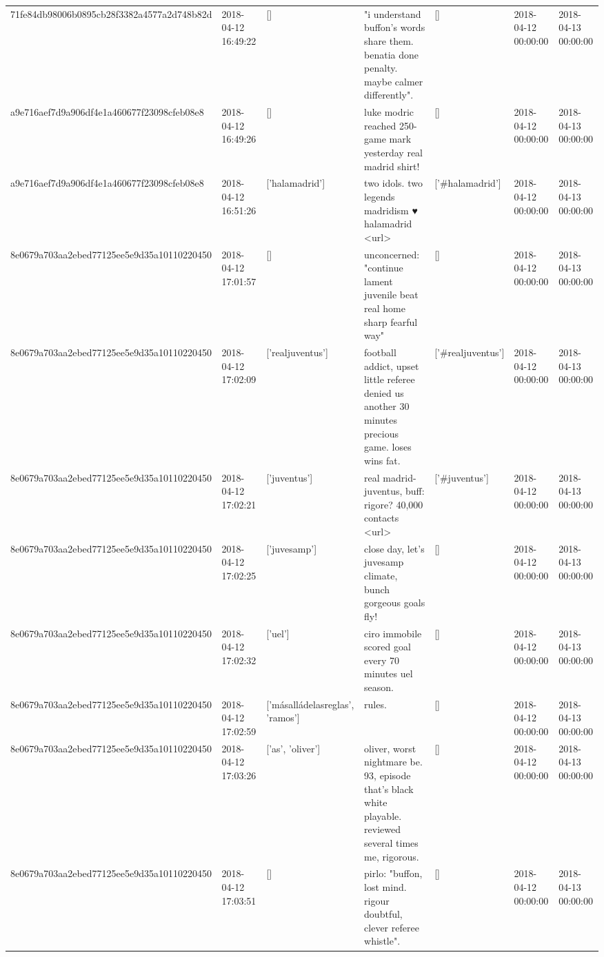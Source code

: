 \begin{tabular}{lllllll}
71fe84db98006b0895cb28f3382a4577a2d748b82d & 2018-04-12 16:49:22 & [] & "i understand buffon's words share them. benatia done penalty. maybe calmer differently". & [] & 2018-04-12 00:00:00 & 2018-04-13 00:00:00 \\
a9e716aef7d9a906df4e1a460677f23098cfeb08e8 & 2018-04-12 16:49:26 & [] & luke modric reached 250-game mark yesterday real madrid shirt! & [] & 2018-04-12 00:00:00 & 2018-04-13 00:00:00 \\
a9e716aef7d9a906df4e1a460677f23098cfeb08e8 & 2018-04-12 16:51:26 & ['halamadrid'] & two idols. two legends madridism ♥️ halamadrid <url> & ['#halamadrid'] & 2018-04-12 00:00:00 & 2018-04-13 00:00:00 \\
8e0679a703aa2ebed77125ee5e9d35a10110220450 & 2018-04-12 17:01:57 & [] & unconcerned: "continue lament juvenile beat real home sharp fearful way" & [] & 2018-04-12 00:00:00 & 2018-04-13 00:00:00 \\
8e0679a703aa2ebed77125ee5e9d35a10110220450 & 2018-04-12 17:02:09 & ['realjuventus'] & football addict, upset little referee denied us another 30 minutes precious game. loses wins fat. & ['#realjuventus'] & 2018-04-12 00:00:00 & 2018-04-13 00:00:00 \\
8e0679a703aa2ebed77125ee5e9d35a10110220450 & 2018-04-12 17:02:21 & ['juventus'] & real madrid-juventus, buff: rigore? 40,000 contacts <url> & ['#juventus'] & 2018-04-12 00:00:00 & 2018-04-13 00:00:00 \\
8e0679a703aa2ebed77125ee5e9d35a10110220450 & 2018-04-12 17:02:25 & ['juvesamp'] & close day, let's juvesamp climate, bunch gorgeous goals fly! & [] & 2018-04-12 00:00:00 & 2018-04-13 00:00:00 \\
8e0679a703aa2ebed77125ee5e9d35a10110220450 & 2018-04-12 17:02:32 & ['uel'] & ciro immobile scored goal every 70 minutes uel season. & [] & 2018-04-12 00:00:00 & 2018-04-13 00:00:00 \\
8e0679a703aa2ebed77125ee5e9d35a10110220450 & 2018-04-12 17:02:59 & ['másalládelasreglas', 'ramos'] & rules. & [] & 2018-04-12 00:00:00 & 2018-04-13 00:00:00 \\
8e0679a703aa2ebed77125ee5e9d35a10110220450 & 2018-04-12 17:03:26 & ['as', 'oliver'] & oliver, worst nightmare be. 93, episode that's black white playable. reviewed several times me, rigorous. & [] & 2018-04-12 00:00:00 & 2018-04-13 00:00:00 \\
8e0679a703aa2ebed77125ee5e9d35a10110220450 & 2018-04-12 17:03:51 & [] & pirlo: "buffon, lost mind. rigour doubtful, clever referee whistle". & [] & 2018-04-12 00:00:00 & 2018-04-13 00:00:00 \\

\end{tabular}
